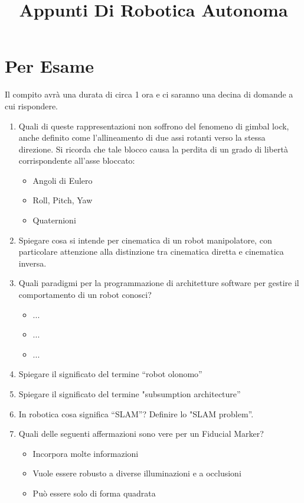 \documentclass[a4paper,portrait,12pt]{article}
\theoremstyle{definition}
\begin{document}
\title{Appunti Di Robotica Autonoma}

\maketitle
\date
\newpage

\tableofcontents
\newpage



\section{Per Esame}



Il compito avrà una durata di circa 1 ora e ci saranno una decina di domande a cui rispondere.
\begin{enumerate}
\item Quali di queste rappresentazioni non soffrono del fenomeno di gimbal lock, anche definito come l'allineamento di due assi rotanti verso la stessa direzione.
Si ricorda che tale blocco causa la perdita di un grado di libertà corrispondente all'asse bloccato:
\begin{itemize}
\item Angoli di Eulero
\item Roll, Pitch, Yaw
\item Quaternioni
\end{itemize}

\item Spiegare cosa si intende per cinematica di un robot manipolatore, con particolare attenzione alla distinzione tra cinematica diretta e cinematica inversa.

\item Quali paradigmi per la programmazione di architetture software per gestire il comportamento di un robot conosci?
\begin{itemize}
\item ...
\item ...
\item ...
\end{itemize}

\item Spiegare il significato del termine “robot olonomo”
\item Spiegare il significato del termine "subsumption architecture”
\item In robotica cosa significa “SLAM”? Definire lo "SLAM problem”.
\item Quali delle seguenti affermazioni sono vere per un Fiducial Marker?
\begin{itemize}
\item Incorpora molte informazioni
\item Vuole essere robusto a diverse illuminazioni e a occlusioni
\item Può essere solo di forma quadrata
\end{itemize}


\end{enumerate}
\end{document}
